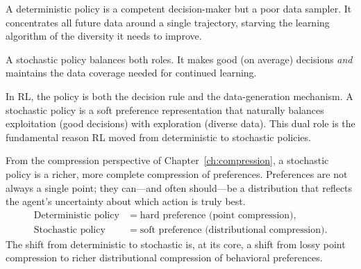 A deterministic policy is a competent decision-maker but a poor data sampler.
It concentrates all future data around a single trajectory, starving the
learning algorithm of the diversity it needs to improve.

A stochastic policy balances both roles.  It makes good (on average) decisions
\emph{and} maintains the data coverage needed for continued learning.

\begin{keyidea}
In RL, the policy is both the decision rule and the data-generation mechanism.
A stochastic policy is a soft preference representation that naturally balances
exploitation (good decisions) with exploration (diverse data).  This dual role
is the fundamental reason RL moved from deterministic to stochastic policies.
\end{keyidea}

From the compression perspective of Chapter~\ref{ch:compression}, a stochastic
policy is a richer, more complete compression of preferences.  Preferences are
not always a single point; they can---and often should---be a distribution that
reflects the agent's uncertainty about which action is truly best.
\begin{align}
  \text{Deterministic policy} &= \text{hard preference (point compression)}, \\
  \text{Stochastic policy}    &= \text{soft preference (distributional compression)}.
\end{align}
The shift from deterministic to stochastic is, at its core, a shift from lossy
point compression to richer distributional compression of behavioral preferences.
